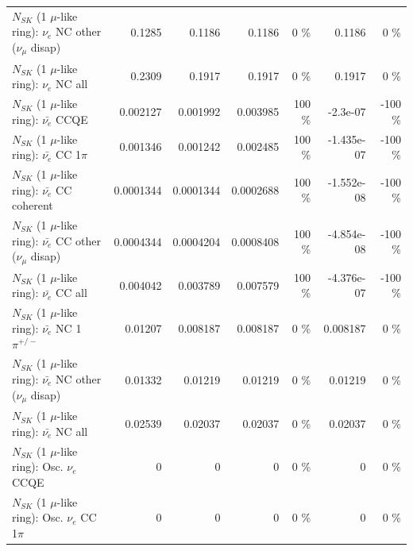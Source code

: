 \begin{table}
\begin{tabular}{| l | r | r | r  r | r  r |}
                $N_{SK}$ (1 $\mu$-like ring): $\nu_e$ NC other ($\nu_\mu$ disap) &          0.1285 &          0.1186 &          0.1186 &        0 \%  &          0.1186 &        0 \%  \\ 
                                  $N_{SK}$ (1 $\mu$-like ring): $\nu_{e}$ NC all &          0.2309 &          0.1917 &          0.1917 &        0 \%  &          0.1917 &        0 \%  \\ 
\hline
\hline
\hline
                                $N_{SK}$ (1 $\mu$-like ring): $\bar{\nu_e}$ CCQE &        0.002127 &        0.001992 &        0.003985 &      100 \%  &        -2.3e-07 &     -100 \%  \\ 
                           $N_{SK}$ (1 $\mu$-like ring): $\bar{\nu_e}$ CC 1$\pi$ &        0.001346 &        0.001242 &        0.002485 &      100 \%  &      -1.435e-07 &     -100 \%  \\ 
                         $N_{SK}$ (1 $\mu$-like ring): $\bar{\nu_e}$ CC coherent &       0.0001344 &       0.0001344 &       0.0002688 &      100 \%  &      -1.552e-08 &     -100 \%  \\ 
          $N_{SK}$ (1 $\mu$-like ring): $\bar{\nu_e}$ CC other ($\nu_\mu$ disap) &       0.0004344 &       0.0004204 &       0.0008408 &      100 \%  &      -4.854e-08 &     -100 \%  \\ 
                            $N_{SK}$ (1 $\mu$-like ring): $\bar{\nu_{e}}$ CC all &        0.004042 &        0.003789 &        0.007579 &      100 \%  &      -4.376e-07 &     -100 \%  \\ 
\hline
                     $N_{SK}$ (1 $\mu$-like ring): $\bar{\nu_e}$ NC 1$\pi^{+/-}$ &         0.01207 &        0.008187 &        0.008187 &        0 \%  &        0.008187 &        0 \%  \\ 
          $N_{SK}$ (1 $\mu$-like ring): $\bar{\nu_e}$ NC other ($\nu_\mu$ disap) &         0.01332 &         0.01219 &         0.01219 &        0 \%  &         0.01219 &        0 \%  \\ 
                            $N_{SK}$ (1 $\mu$-like ring): $\bar{\nu_{e}}$ NC all &         0.02539 &         0.02037 &         0.02037 &        0 \%  &         0.02037 &        0 \%  \\ 
\hline
\hline
\hline
                                 $N_{SK}$ (1 $\mu$-like ring): Osc. $\nu_e$ CCQE &               0 &               0 &               0 &        0 \%  &               0 &        0 \%  \\ 
                            $N_{SK}$ (1 $\mu$-like ring): Osc. $\nu_e$ CC 1$\pi$ &               0 &               0 &               0 &        0 \%  &               0 &        0 \%  \\ 

\end{tabular}
\end{table}
